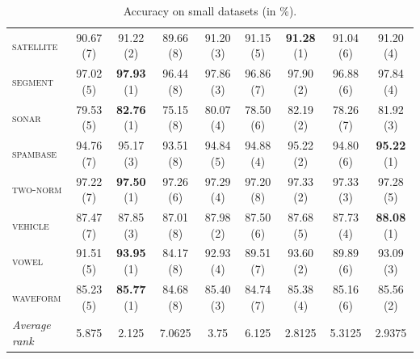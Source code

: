 \begin{table}
\begin{tabular}{|l|cccccccc|}
    \textsc{satellite }  & 90.67 (7)    & 91.22 (2)    & 89.66 (8)    & 91.20 (3)    & 91.15 (5)    & \textbf{91.28} (1)    & 91.04 (6)   &  91.20 (4) \\
    \textsc{segment   }  & 97.02 (5)    & \textbf{97.93} (1)    & 96.44 (8)    & 97.86 (3)    & 96.86 (7)    & 97.90 (2)    & 96.88 (6)   &  97.84 (4) \\
    \textsc{sonar     }  & 79.53 (5)    & \textbf{82.76} (1)    & 75.15 (8)    & 80.07 (4)    & 78.50 (6)    & 82.19 (2)    & 78.26 (7)   &  81.92 (3) \\
    \textsc{spambase  }  & 94.76 (7)    & 95.17 (3)    & 93.51 (8)    & 94.84 (5)    & 94.88 (4)    & 95.22 (2)    & 94.80 (6)   &  \textbf{95.22} (1) \\
    \textsc{two-norm  }  & 97.22 (7)    & \textbf{97.50} (1)    & 97.26 (6)    & 97.29 (4)    & 97.20 (8)    & 97.33 (2)    & 97.33 (3)   &  97.28 (5) \\
    \textsc{vehicle   }  & 87.47 (7)    & 87.85 (3)    & 87.01 (8)    & 87.98 (2)    & 87.50 (6)    & 87.68 (5)    & 87.73 (4)   &  \textbf{88.08} (1) \\
    \textsc{vowel     }  & 91.51 (5)    & \textbf{93.95} (1)    & 84.17 (8)    & 92.93 (4)    & 89.51 (7)    & 93.60 (2)    & 89.89 (6)   &  93.09 (3) \\
    \textsc{waveform  }  & 85.23 (5)    & \textbf{85.77} (1)    & 84.68 (8)    & 85.40 (3)    & 84.74 (7)    & 85.38 (4)    & 85.16 (6)   &  85.56 (2) \\
\hline
\textit{Average rank} & 5.875 & 2.125 & 7.0625 & 3.75 & 6.125 & 2.8125 & 5.3125 & 2.9375 \\
\hline
\end{tabular}
    \caption{Accuracy on small datasets (in \%).}
    \label{table:rp:accuracy}
\end{table}

